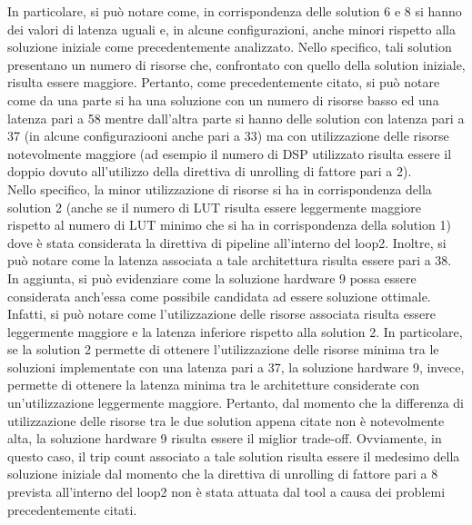 In particolare, si può notare come, in corrispondenza delle solution 6 e 8 si hanno dei valori di latenza uguali e, in alcune configurazioni, anche minori rispetto alla soluzione iniziale come precedentemente analizzato. Nello specifico, tali solution presentano un numero di risorse che, confrontato con quello della solution iniziale, risulta essere maggiore. Pertanto, come precedentemente citato, si può notare come da una parte si ha una soluzione con un numero di risorse basso ed una latenza pari a 58 mentre dall'altra parte si hanno delle solution con latenza pari a 37 (in alcune configuraziooni anche pari a 33) ma con utilizzazione delle risorse notevolmente maggiore (ad esempio il numero di DSP utilizzato risulta essere il doppio dovuto all'utilizzo della direttiva di unrolling di fattore pari a 2).
\\
Nello specifico, la minor utilizzazione di risorse si ha in corrispondenza della solution 2 (anche se il numero di LUT risulta essere leggermente maggiore rispetto al numero di LUT minimo che si ha in corrispondenza della solution 1) dove è stata considerata la direttiva di pipeline all'interno del loop2. Inoltre, si può notare come la latenza associata a tale architettura risulta essere pari a 38. In aggiunta, si può evidenziare come la soluzione hardware 9 possa essere considerata anch'essa come possibile candidata ad essere soluzione ottimale. Infatti, si può notare come l'utilizzazione delle risorse associata risulta essere leggermente maggiore e la latenza inferiore rispetto alla solution 2. In particolare, se la solution 2 permette di ottenere l'utilizzazione delle risorse minima tra le soluzioni implementate con una latenza pari a 37, la soluzione hardware 9, invece, permette di ottenere la latenza minima tra le architetture considerate con un'utilizzazione leggermente maggiore. Pertanto, dal momento che la differenza di utilizzazione delle risorse tra le due solution appena citate non è notevolmente alta, la soluzione hardware 9 risulta essere il miglior trade-off. Ovviamente, in questo caso, il trip count associato a tale solution risulta essere il medesimo della soluzione iniziale dal momento che la direttiva di unrolling di fattore pari a 8 prevista all'interno del loop2 non è stata attuata dal tool a causa dei problemi precedentemente citati.